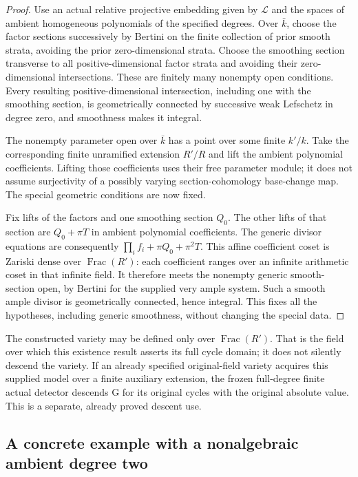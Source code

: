 \begin{proof}
Use an actual relative projective embedding
given by $\mathcal L$ and the spaces of
ambient homogeneous polynomials of the
specified degrees.  Over $\bar k$, choose
the factor sections successively by Bertini
on the finite collection of prior smooth
strata, avoiding the prior zero-dimensional
strata.  Choose the smoothing section
transverse to all positive-dimensional
factor strata and avoiding their zero-
dimensional intersections.  These are
finitely many nonempty open conditions.
Every resulting positive-dimensional
intersection, including one with the
smoothing section, is geometrically
connected by successive weak Lefschetz
in degree zero, and smoothness makes
it integral.

The nonempty parameter open over $\bar k$
has a point over some finite $k'/k$.
Take the corresponding finite unramified
extension $R'/R$ and lift the ambient
polynomial coefficients.  Lifting those
coefficients uses their free parameter
module; it does not assume surjectivity
of a possibly varying section-cohomology
base-change map.  The special geometric
conditions are now fixed.

Fix lifts of the factors and one smoothing
section $Q_0$.  The other lifts of that
section are $Q_0+\pi T$ in ambient
polynomial coefficients.  The generic
divisor equations are consequently
$\prod_i f_i+\pi Q_0+\pi^2T$.
This affine coefficient coset is Zariski
dense over $\operatorname{Frac}(R')$:
each coefficient ranges over an infinite
arithmetic coset in that infinite field.
It therefore meets the nonempty generic
smooth-section open, by Bertini for the
supplied very ample system.  Such a
smooth ample divisor is geometrically
connected, hence integral.  This fixes
all the hypotheses, including generic
smoothness, without changing the special
data.
\end{proof}

The constructed variety may be defined only
over $\operatorname{Frac}(R')$.  That is
the field over which this existence result
asserts its full cycle domain; it does not
silently descend the variety.  If an
already specified original-field variety
acquires this supplied model over a finite
auxiliary extension, the frozen full-degree
finite actual detector descends G for its
original cycles with the original absolute
value.  This is a separate, already proved
descent use.

\subsection{A concrete example with a nonalgebraic ambient degree two}


